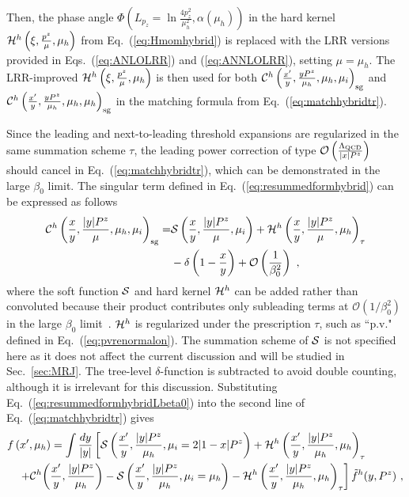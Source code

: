 \documentclass[a4paper,11pt]{article}
\begin{document}
Then, the phase angle $\Phi\left(L_{p_z}=\ln \frac{4p_z^2}{\mu_h^2},\alpha(\mu_h)\right)$ in the hard kernel ${\cal H}^{h}\left( \xi,\frac{p^z}{\mu},\mu_h\right)$ from Eq.~(\ref{eq:Hmomhybrid}) is replaced with the LRR versions provided in Eqs.~(\ref{eq:ANLOLRR}) and (\ref{eq:ANNLOLRR}), setting $\mu=\mu_h$. The LRR-improved ${\cal H}^{h}\left( \xi,\frac{p^z}{\mu},\mu_h\right)$ is then used for both ${\cal C}^{h}\left(\frac{x'}{y},\frac{y P^z}{\mu_h},\mu_h,\mu_i\right)_{\rm sg}$ and
${\cal C}^{h}\left(\frac{x'}{y},\frac{y P^z}{\mu_h},\mu_h,\mu_h\right)_{\rm sg}$ in the matching formula from Eq.~(\ref{eq:matchhybridtr}). 

Since the leading and next-to-leading threshold expansions are regularized in the same summation scheme $\tau$, the leading power correction of type $\mathcal{O}\left(\frac{\Lambda_{\rm QCD}}{|x| P^z}\right)$ should cancel in Eq.~(\ref{eq:matchhybridtr}), which can be demonstrated in the large $\beta_0$ limit. The singular term defined in Eq.~(\ref{eq:resummedformhybrid}) can be expressed as follows
\begin{align}\label{eq:resummedformhybridLbeta0}
{\cal C}^{h}\left(\frac{x}{y},\frac{|y|P^z}{\mu},\mu_h,\mu_i\right)_{\rm sg} = & {\cal S}\left( \frac{x}{y},\frac{|y|P^z}{\mu},\mu_i\right) +  {\cal H}^{h}\left( \frac{x}{y},\frac{|y|P^z}{\mu},\mu_h\right)_{\tau} \nonumber\\
& - \delta\left(1-\frac{x}{y}\right) + \mathcal{O}\left(\frac{1}{\beta_{0}^2}\right) \ ,
\end{align}
where the soft function ${\cal S}$ and hard kernel ${\cal H}^{h}$ can be added rather than convoluted because their product contributes only subleading terms at $\mathcal{O}\left(1/\beta_0^2\right)$ in the large $\beta_0$ limit~\cite{Liu:2023onm,Liu:2024omb}. ${\cal H}^{h}$ is regularized under the prescription $\tau$, such as ``p.v." defined in Eq.~(\ref{eq:pvrenormalon}). The summation scheme of ${\cal S}$ is not specified here as it does not affect the current discussion and will be studied in Sec.~\ref{sec:MRJ}. The tree-level $\delta$-function is subtracted to avoid double counting, although it is irrelevant for this discussion. Substituting Eq.~(\ref{eq:resummedformhybridLbeta0}) into the second line of Eq.~(\ref{eq:matchhybridtr}) gives
\begin{align}\label{eq:LPALbeta0}
&f\left(x',\mu_h\right)=\int \frac{dy}{|y|} \left[ {\cal S}\left( \frac{x'}{y},\frac{|y|P^z}{\mu_h},\mu_i=2|1-x|P^z\right) + {\cal H}^{h}\left( \frac{x'}{y},\frac{|y|P^z}{\mu_h},\mu_h\right)_{\tau} \right.\nonumber\\
&\left.\quad + {\cal C}^{h}\bigg(\frac{x'}{y},\frac{|y| P^z}{\mu_h}\bigg) - {\cal S}\left( \frac{x'}{y},\frac{|y|P^z}{\mu_h},\mu_i=\mu_h\right) - {\cal H}^{h}\left( \frac{x'}{y},\frac{|y|P^z}{\mu_h},\mu_h\right)_{\tau} \right]\tilde f^{h}(y,P^z) \ ,
\end{align}
\end{document}
